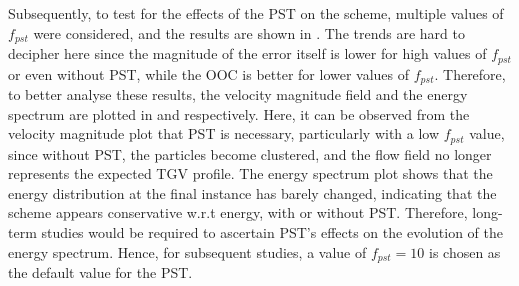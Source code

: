 Subsequently, to test for the effects of the PST on the scheme, multiple values of $f_{pst}$ were considered, and the results are shown in .
The trends are hard to decipher here since the magnitude of the error itself is lower for high values of $f_{pst}$ or even without PST, while the OOC is better for lower values of $f_{pst}$.
Therefore, to better analyse these results, the velocity magnitude field and the energy spectrum are plotted in  and  respectively.
Here, it can be observed from the velocity magnitude plot that PST is necessary, particularly with a low $f_{pst}$ value, since without PST, the particles become clustered, and the flow field no longer represents the expected TGV profile.
The energy spectrum plot shows that the energy distribution at the final instance has barely changed, indicating that the scheme appears conservative w.r.t energy, with or without PST. Therefore, long-term studies would be required to ascertain PST's effects on the evolution of the energy spectrum.
Hence, for subsequent studies, a value of $f_{pst} = 10$ is chosen as the default value for the PST.

